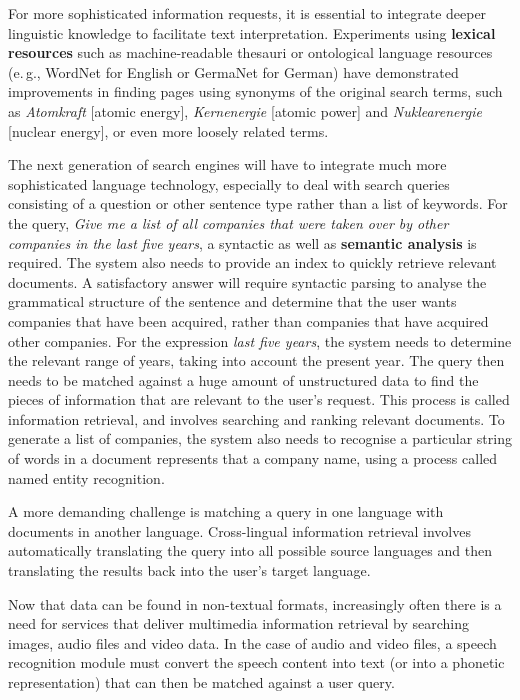 \begin{multicols}{2}
For more sophisticated information requests, it is essential to integrate deeper linguistic knowledge to facilitate text interpretation. Experiments using \textbf{lexical resources} such as machine-readable thesauri or ontological language resources (e.\,g., WordNet for English or GermaNet for German) have demonstrated improvements in finding pages using synonyms of the original search terms, such as \textit{Atomkraft} {[}atomic energy{]}, \textit{Kernenergie} {[}atomic power{]} and \textit{Nuklearenergie} {[}nuclear energy{]}, or even more loosely related terms.


The next generation of search engines will have to integrate much more sophisticated language technology, especially to deal with search queries consisting of a question or other sentence type rather than a list of keywords. For the query, \textit{Give me a list of all companies that were taken over by other companies in the last five years}, a syntactic as well as \textbf{semantic analysis} is required. The system also needs to provide an index to quickly retrieve relevant documents. A satisfactory answer will require syntactic parsing to analyse the grammatical structure of the sentence and determine that the user wants companies that have been acquired, rather than companies that have acquired other companies. For the expression \textit{last five years}, the system needs to determine the relevant range of years, taking into account the present year. The query then needs to be matched against a huge amount of unstructured data to find the pieces of information that are relevant to the user’s request. This process is called information retrieval, and involves searching and ranking relevant documents. To generate a list of companies, the system also needs to recognise a particular string of words in a document represents that a company name, using a process called named entity recognition.

A more demanding challenge is matching a query in one language with documents in another language. Cross-lingual information retrieval involves automatically translating the query into all possible source languages and then translating the results back into the user's target language.

Now that data can be found in non-textual formats, increasingly often there is a need for services that deliver multimedia information retrieval by searching images, audio files and video data. In the case of audio and video files, a speech recognition module must convert the speech content into text (or into a phonetic representation) that can then be matched against a user query.


\end{multicols}
